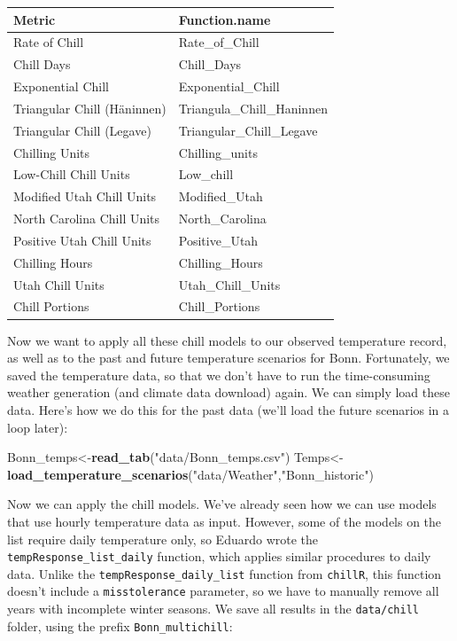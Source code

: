 \documentclass[
]{book}
\newenvironment{Shaded}{\begin{snugshade}}{\end{snugshade}}
\newcommand{\KeywordTok}[1]{\textcolor[rgb]{0.13,0.29,0.53}{\textbf{#1}}}
\newcommand{\NormalTok}[1]{#1}
\newcommand{\StringTok}[1]{\textcolor[rgb]{0.31,0.60,0.02}{#1}}
\begin{document}
\begingroup\fontsize{10}{12}\selectfont

\begin{tabular}{l|l}
\hline
Metric & Function.name\\
\hline
Rate of Chill & Rate\_of\_Chill\\
\hline
Chill Days & Chill\_Days\\
\hline
Exponential Chill & Exponential\_Chill\\
\hline
Triangular Chill (Häninnen) & Triangula\_Chill\_Haninnen\\
\hline
Triangular Chill (Legave) & Triangular\_Chill\_Legave\\
\hline
Chilling Units & Chilling\_units\\
\hline
Low-Chill Chill Units & Low\_chill\\
\hline
Modified Utah Chill Units & Modified\_Utah\\
\hline
North Carolina Chill Units & North\_Carolina\\
\hline
Positive Utah Chill Units & Positive\_Utah\\
\hline
Chilling Hours & Chilling\_Hours\\
\hline
Utah Chill Units & Utah\_Chill\_Units\\
\hline
Chill Portions & Chill\_Portions\\
\hline
\end{tabular}
\endgroup{}

Now we want to apply all these chill models to our observed temperature record, as well as to the past and future temperature scenarios for Bonn. Fortunately, we saved the temperature data, so that we don't have to run the time-consuming weather generation (and climate data download) again. We can simply load these data. Here's how we do this for the past data (we'll load the future scenarios in a loop later):

\begin{Shaded}
\begin{Highlighting}[]
\NormalTok{Bonn_temps<-}\KeywordTok{read_tab}\NormalTok{(}\StringTok{"data/Bonn_temps.csv"}\NormalTok{)}
\NormalTok{Temps<-}\KeywordTok{load_temperature_scenarios}\NormalTok{(}\StringTok{"data/Weather"}\NormalTok{,}\StringTok{"Bonn_historic"}\NormalTok{)}
\end{Highlighting}
\end{Shaded}

Now we can apply the chill models. We've already seen how we can use models that use hourly temperature data as input. However, some of the models on the list require daily temperature only, so Eduardo wrote the \texttt{tempResponse\_list\_daily} function, which applies similar procedures to daily data. Unlike the \texttt{tempResponse\_daily\_list} function from \texttt{chillR}, this function doesn't include a \texttt{misstolerance} parameter, so we have to manually remove all years with incomplete winter seasons. We save all results in the \texttt{data/chill} folder, using the prefix \texttt{Bonn\_multichill}:
\end{document}
